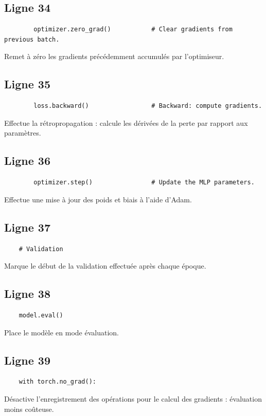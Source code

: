 \documentclass[11pt,a4paper]{article}
\begin{document}
\subsection*{Ligne 34}
\begin{lstlisting}
        optimizer.zero_grad()           # Clear gradients from previous batch.
\end{lstlisting}
Remet à zéro les gradients précédemment accumulés par l'optimiseur.

\subsection*{Ligne 35}
\begin{lstlisting}
        loss.backward()                 # Backward: compute gradients.
\end{lstlisting}
Effectue la rétropropagation : calcule les dérivées de la perte par rapport aux paramètres.

\subsection*{Ligne 36}
\begin{lstlisting}
        optimizer.step()                # Update the MLP parameters.
\end{lstlisting}
Effectue une mise à jour des poids et biais à l'aide d'Adam.

\subsection*{Ligne 37}
\begin{lstlisting}
    # Validation
\end{lstlisting}
Marque le début de la validation effectuée après chaque époque.

\subsection*{Ligne 38}
\begin{lstlisting}
    model.eval()
\end{lstlisting}
Place le modèle en mode évaluation.

\subsection*{Ligne 39}
\begin{lstlisting}
    with torch.no_grad():
\end{lstlisting}
Désactive l'enregistrement des opérations pour le calcul des gradients : évaluation moins coûteuse.
\end{document}
